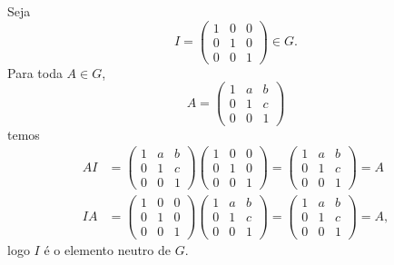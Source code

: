 \documentclass[12pt]{exam}
\begin{document}
    Seja
    \[
        I = \begin{pmatrix} 1 & 0 & 0\\0 & 1 & 0\\0 & 0 & 1\end{pmatrix} \in G.
    \]
    Para toda $A \in G$,
    \[
        A = \begin{pmatrix} 1 & a & b\\0 & 1 & c\\0 & 0 & 1\end{pmatrix}
    \]
    temos
    \begin{align*}
        AI &= \begin{pmatrix} 1 & a & b\\0 & 1 & c\\0 & 0 & 1\end{pmatrix} \begin{pmatrix} 1 & 0 & 0\\0 & 1 & 0\\0 & 0 & 1\end{pmatrix} = \begin{pmatrix} 1 & a & b\\0 & 1 & c\\0 & 0 & 1\end{pmatrix} = A\\
        IA &= \begin{pmatrix} 1 & 0 & 0\\0 & 1 & 0\\0 & 0 & 1\end{pmatrix}\begin{pmatrix} 1 & a & b\\0 & 1 & c\\0 & 0 & 1\end{pmatrix} = \begin{pmatrix} 1 & a & b\\0 & 1 & c\\0 & 0 & 1\end{pmatrix} = A,
    \end{align*}
    logo $I$ é o elemento neutro de $G$.
\end{document}
